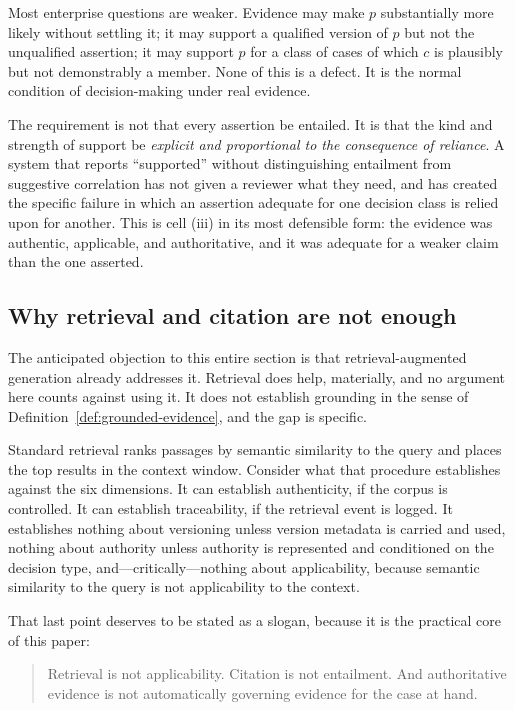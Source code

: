 \documentclass[11pt]{article}
\theoremstyle{plain}
\theoremstyle{definition}
\begin{document}
Most enterprise questions are weaker. Evidence may make $p$ substantially more
likely without settling it; it may support a qualified version of $p$ but not the
unqualified assertion; it may support $p$ for a class of cases of which $c$ is
plausibly but not demonstrably a member. None of this is a defect. It is the normal
condition of decision-making under real evidence.

The requirement is not that every assertion be entailed. It is that the kind and
strength of support be \emph{explicit and proportional to the consequence of
reliance}. A system that reports ``supported'' without distinguishing entailment
from suggestive correlation has not given a reviewer what they need, and has
created the specific failure in which an assertion adequate for one decision class
is relied upon for another. This is cell (iii) in its most defensible form: the
evidence was authentic, applicable, and authoritative, and it was adequate for a
weaker claim than the one asserted.

\subsection{Why retrieval and citation are not enough}
\label{sec:retrieval-insufficient}

The anticipated objection to this entire section is that retrieval-augmented
generation \citep{lewis2020} already addresses it. Retrieval does help, materially,
and no argument here counts against using it. It does not establish grounding in
the sense of Definition~\ref{def:grounded-evidence}, and the gap is specific.

Standard retrieval ranks passages by semantic similarity to the query and places
the top results in the context window. Consider what that procedure establishes
against the six dimensions. It can establish authenticity, if the corpus is
controlled. It can establish traceability, if the retrieval event is logged. It
establishes nothing about versioning unless version metadata is carried and used,
nothing about authority unless authority is represented and conditioned on the
decision type, and---critically---nothing about applicability, because semantic
similarity to the query is not applicability to the context.

That last point deserves to be stated as a slogan, because it is the practical core
of this paper:

\begin{quote}
Retrieval is not applicability. Citation is not entailment. And authoritative
evidence is not automatically governing evidence for the case at hand.
\end{quote}
\end{document}

